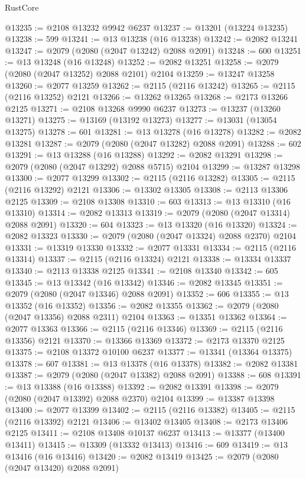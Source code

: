 \begin{lexlean}{RustCore}
\begin{coremodule}
@13235 := @2108 @13232 @9942 @6237
@13237 := @13201 (@13224 @13235)
@13238 := 599
@13241 := @13 @13238 (@16 @13238)
@13242 := @2082 @13241
@13247 := @2079 (@2080 (@2047 @13242) @2088 @2091)
@13248 := 600
@13251 := @13 @13248 (@16 @13248)
@13252 := @2082 @13251
@13258 := @2079 (@2080 (@2047 @13252) @2088 @2101) @2104
@13259 := @13247 @13258
@13260 := @2077 @13259
@13262 := @2115 (@2116 @13242)
@13265 := @2115 (@2116 @13252) @2121
@13266 := @13262 @13265
@13268 := @2173 @13266 @2125
@13271 := @2108 @13268 @9990 @6237
@13273 := @13237 (@13260 @13271)
@13275 := @13169 (@13192 @13273)
@13277 := @13031 (@13054 @13275)
@13278 := 601
@13281 := @13 @13278 (@16 @13278)
@13282 := @2082 @13281
@13287 := @2079 (@2080 (@2047 @13282) @2088 @2091)
@13288 := 602
@13291 := @13 @13288 (@16 @13288)
@13292 := @2082 @13291
@13298 := @2079 (@2080 (@2047 @13292) @2088 @5715) @2104
@13299 := @13287 @13298
@13300 := @2077 @13299
@13302 := @2115 (@2116 @13282)
@13305 := @2115 (@2116 @13292) @2121
@13306 := @13302 @13305
@13308 := @2113 @13306 @2125
@13309 := @2108 @13308
@13310 := 603
@13313 := @13 @13310 (@16 @13310)
@13314 := @2082 @13313
@13319 := @2079 (@2080 (@2047 @13314) @2088 @2091)
@13320 := 604
@13323 := @13 @13320 (@16 @13320)
@13324 := @2082 @13323
@13330 := @2079 (@2080 (@2047 @13324) @2088 @2370) @2104
@13331 := @13319 @13330
@13332 := @2077 @13331
@13334 := @2115 (@2116 @13314)
@13337 := @2115 (@2116 @13324) @2121
@13338 := @13334 @13337
@13340 := @2113 @13338 @2125
@13341 := @2108 @13340
@13342 := 605
@13345 := @13 @13342 (@16 @13342)
@13346 := @2082 @13345
@13351 := @2079 (@2080 (@2047 @13346) @2088 @2091)
@13352 := 606
@13355 := @13 @13352 (@16 @13352)
@13356 := @2082 @13355
@13362 := @2079 (@2080 (@2047 @13356) @2088 @2311) @2104
@13363 := @13351 @13362
@13364 := @2077 @13363
@13366 := @2115 (@2116 @13346)
@13369 := @2115 (@2116 @13356) @2121
@13370 := @13366 @13369
@13372 := @2173 @13370 @2125
@13375 := @2108 @13372 @10100 @6237
@13377 := @13341 (@13364 @13375)
@13378 := 607
@13381 := @13 @13378 (@16 @13378)
@13382 := @2082 @13381
@13387 := @2079 (@2080 (@2047 @13382) @2088 @2091)
@13388 := 608
@13391 := @13 @13388 (@16 @13388)
@13392 := @2082 @13391
@13398 := @2079 (@2080 (@2047 @13392) @2088 @2370) @2104
@13399 := @13387 @13398
@13400 := @2077 @13399
@13402 := @2115 (@2116 @13382)
@13405 := @2115 (@2116 @13392) @2121
@13406 := @13402 @13405
@13408 := @2173 @13406 @2125
@13411 := @2108 @13408 @10137 @6237
@13413 := @13377 (@13400 @13411)
@13415 := @13309 (@13332 @13413)
@13416 := 609
@13419 := @13 @13416 (@16 @13416)
@13420 := @2082 @13419
@13425 := @2079 (@2080 (@2047 @13420) @2088 @2091)

\end{coremodule}
\end{lexlean}
